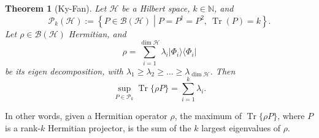 \documentclass{article}
\newtheorem{proposition}{Proposition}
\newtheorem{theorem}{Theorem}
\theoremstyle{definition}
\newcommand{\tr}{\operatorname{Tr}}
\newcommand{\ket}[1]{\vert #1 \rangle}
\newcommand{\bra}[1]{\langle #1 \vert}
\newcommand{\bounded}[1]{\mathcal{B}(#1)}
\begin{document}
\begin{theorem}[Ky-Fan]\label{thm:Ky-Fan}
  Let $\mathcal{H}$ be a Hilbert space, $k\in\mathbb{N}$, and 
  \begin{equation*}
    \mathcal{P}_k(\mathcal{H}):= \left\{ P\in\bounded{\mathcal{H}} \middle|  P = P^\dagger = P^2,\ \tr(P)=k\right\}.
  \end{equation*}
  Let $\rho\in \bounded{\mathcal{H}}$ Hermitian, and 
  \begin{equation*}
    \rho = \sum_{i=1}^{\dim\mathcal{H}} \lambda_i \ket{\Phi_i}\bra{\Phi_i}
  \end{equation*}
  be its eigen decomposition, with $\lambda_1 \geq \lambda_2 \geq \dots \geq \lambda_{\dim \mathcal{H}}$. Then 
  \begin{equation*}
    \sup_{P\in\mathcal{P}_k} \tr\{\rho P\} = \sum_{i=1}^k \lambda_i.
  \end{equation*}
\end{theorem}

In other words, given a Hermitian operator $\rho$, the maximum of $\tr\{\rho P\}$, where $P$ is a rank-$k$ Hermitian projector, is the sum of the $k$ largest eigenvalues of $\rho$.
\end{document}
